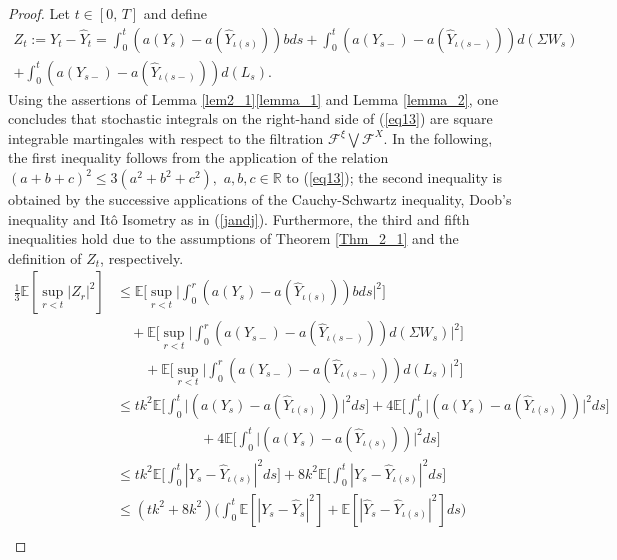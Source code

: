 \begin{proof}
    Let $t \in [0, \, T]$ and define 
    \begin{multline}\label{eq13}
          Z_t := Y_t - \hat{Y}_{t} = \int^t_{0} (a(Y_s) - a(\hat{Y}_{\iota(s)}))bds + \int^t_{0} (a(Y_{s-})-a(\hat{Y}_{\iota(s-)}))d(\Sigma W_s)\\ + \int^t_{0} (a(Y_{s-})-a(\hat{Y}_{\iota(s-)}))d(L_s).
    \end{multline}
Using the assertions of Lemma \ref{lem2_1}\ref{lemma_1} and Lemma \ref{lemma_2}, one concludes that stochastic integrals on the right-hand side of (\ref{eq13}) are square integrable martingales with respect to the filtration $\mathcal{F}^{\xi} \bigvee \mathcal{F}^{X}$. In the following, the first inequality follows from the application of the relation $(a + b + c)^2 \leq 3(a^2+b^2+c^2), \, \, a,b,c \in \mathbb{R} $ to  (\ref{eq13}); the second inequality is obtained by the successive applications of the Cauchy-Schwartz inequality, Doob's inequality and It\^o Isometry  as in (\ref{jandj}). Furthermore, the third and fifth inequalities hold due to the assumptions of Theorem \ref{Thm_2_1}  and the definition of $Z_t$, respectively.
\begin{align}\label{eq14}
    \frac{1}{3} \mathbb{E}[\sup_{r < t}|Z_r|^2] &\leq \mathbb{E} \bigg[\sup_{r<t}\bigg| \int^r_{0} (a(Y_s) - a(\hat{Y}_{\iota(s)}))bds \bigg|^2 \bigg] \nonumber \\ 
    &\quad+ \mathbb{E} \bigg[ \sup_{r<t} \bigg| \int^r_{0} (a(Y_{s-})-a(\hat{Y}_{\iota(s-)}))d(\Sigma W_s) \bigg|^2 \bigg] \nonumber\\ 
    &\quad\quad+ \mathbb{E} \bigg[ \sup_{r<t} \bigg| \int^r_{0} (a(Y_{s-})-a(\hat{Y}_{\iota(s-)}))d(L_s) \bigg|^2 \bigg] \nonumber \\
    &\leq tk^2 \mathbb{E} \bigg[\int^t_{0} \big|(a(Y_s) - a(\hat{Y}_{\iota(s)}))\big|^2 ds  \bigg] + 4 \mathbb{E} \bigg[ \int^t_{0} \big|(a(Y_{s})-a(\hat{Y}_{\iota(s)}))\big|^2 ds  \bigg]\nonumber \\
    &\qquad\qquad\qquad+ 4\mathbb{E} \bigg[ \int^t_{0} \big|(a(Y_{s})-a(\hat{Y}_{\iota(s)}))\big|^2 ds  \bigg]\\
    &\leq tk^2 \mathbb{E}\bigg[\int^{t}_{0} |Y_s - \hat{Y}_{\iota(s)}|^2ds \bigg] + 8k^2 \mathbb{E}\bigg[\int^{t}_{0} |Y_s - \hat{Y}_{\iota(s)}|^2ds \bigg] \nonumber \\
    &\leq (tk^2 + 8k^2) \bigg( \int^{t}_{0} \mathbb{E}[|Y_s - \hat{Y}_{s}|^2] + \mathbb{E}[|\hat{Y}_{s} - \hat{Y}_{\iota(s)}|^2] ds \bigg) \nonumber \\

\end{align}
\end{proof}
